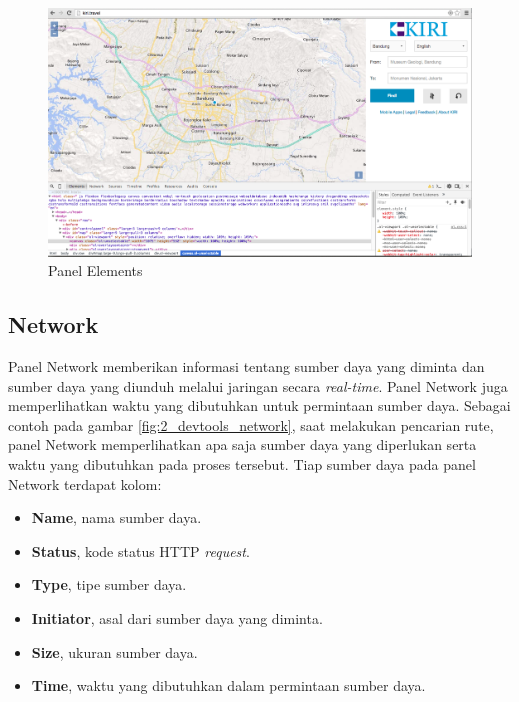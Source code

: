 \begin{figure}[H]
	\centering
	\includegraphics[scale=0.3]{Gambar/devtools-elements}
	\caption{Panel Elements} 
	\label{fig:2_devtools_elements}
\end{figure}

\subsection{Network}
Panel Network memberikan informasi tentang sumber daya yang diminta dan sumber daya yang diunduh melalui jaringan secara \textit{real-time}. Panel Network juga memperlihatkan waktu yang dibutuhkan untuk permintaan sumber daya. Sebagai contoh pada gambar \ref{fig:2_devtools_network}, saat melakukan pencarian rute, panel Network memperlihatkan apa saja sumber daya yang diperlukan serta waktu yang dibutuhkan pada proses tersebut. Tiap sumber daya pada panel Network terdapat kolom:

\begin{itemize}
	\item \textbf{Name}, nama sumber daya.
	\item \textbf{Status}, kode status HTTP \textit{request}.
	\item \textbf{Type}, tipe sumber daya.
	\item \textbf{Initiator}, asal dari sumber daya yang diminta.
	\item \textbf{Size}, ukuran sumber daya.
	\item \textbf{Time}, waktu yang dibutuhkan dalam permintaan sumber daya.
\end{itemize}

